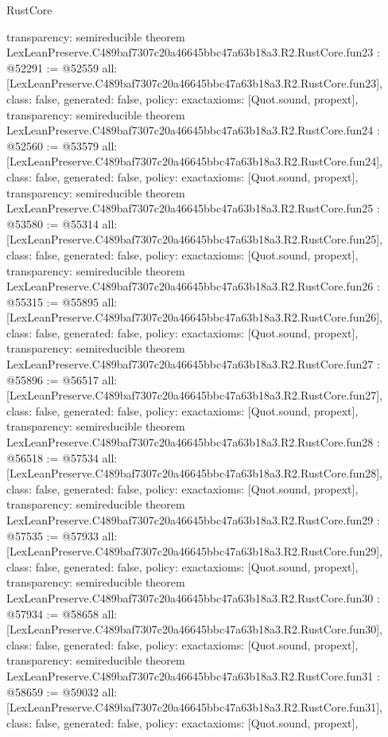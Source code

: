 \begin{lexlean}{RustCore}
\begin{coremodule}
{  transparency: semireducible
}
theorem LexLeanPreserve.C489baf7307c20a46645bbc47a63b18a3.R2.RustCore.fun23 : @52291 := @52559 {
  all: [LexLeanPreserve.C489baf7307c20a46645bbc47a63b18a3.R2.RustCore.fun23],
  class: false,
  generated: false,
  policy: exact{axioms: [Quot.sound, propext]},
  transparency: semireducible
}
theorem LexLeanPreserve.C489baf7307c20a46645bbc47a63b18a3.R2.RustCore.fun24 : @52560 := @53579 {
  all: [LexLeanPreserve.C489baf7307c20a46645bbc47a63b18a3.R2.RustCore.fun24],
  class: false,
  generated: false,
  policy: exact{axioms: [Quot.sound, propext]},
  transparency: semireducible
}
theorem LexLeanPreserve.C489baf7307c20a46645bbc47a63b18a3.R2.RustCore.fun25 : @53580 := @55314 {
  all: [LexLeanPreserve.C489baf7307c20a46645bbc47a63b18a3.R2.RustCore.fun25],
  class: false,
  generated: false,
  policy: exact{axioms: [Quot.sound, propext]},
  transparency: semireducible
}
theorem LexLeanPreserve.C489baf7307c20a46645bbc47a63b18a3.R2.RustCore.fun26 : @55315 := @55895 {
  all: [LexLeanPreserve.C489baf7307c20a46645bbc47a63b18a3.R2.RustCore.fun26],
  class: false,
  generated: false,
  policy: exact{axioms: [Quot.sound, propext]},
  transparency: semireducible
}
theorem LexLeanPreserve.C489baf7307c20a46645bbc47a63b18a3.R2.RustCore.fun27 : @55896 := @56517 {
  all: [LexLeanPreserve.C489baf7307c20a46645bbc47a63b18a3.R2.RustCore.fun27],
  class: false,
  generated: false,
  policy: exact{axioms: [Quot.sound, propext]},
  transparency: semireducible
}
theorem LexLeanPreserve.C489baf7307c20a46645bbc47a63b18a3.R2.RustCore.fun28 : @56518 := @57534 {
  all: [LexLeanPreserve.C489baf7307c20a46645bbc47a63b18a3.R2.RustCore.fun28],
  class: false,
  generated: false,
  policy: exact{axioms: [Quot.sound, propext]},
  transparency: semireducible
}
theorem LexLeanPreserve.C489baf7307c20a46645bbc47a63b18a3.R2.RustCore.fun29 : @57535 := @57933 {
  all: [LexLeanPreserve.C489baf7307c20a46645bbc47a63b18a3.R2.RustCore.fun29],
  class: false,
  generated: false,
  policy: exact{axioms: [Quot.sound, propext]},
  transparency: semireducible
}
theorem LexLeanPreserve.C489baf7307c20a46645bbc47a63b18a3.R2.RustCore.fun30 : @57934 := @58658 {
  all: [LexLeanPreserve.C489baf7307c20a46645bbc47a63b18a3.R2.RustCore.fun30],
  class: false,
  generated: false,
  policy: exact{axioms: [Quot.sound, propext]},
  transparency: semireducible
}
theorem LexLeanPreserve.C489baf7307c20a46645bbc47a63b18a3.R2.RustCore.fun31 : @58659 := @59032 {
  all: [LexLeanPreserve.C489baf7307c20a46645bbc47a63b18a3.R2.RustCore.fun31],
  class: false,
  generated: false,
  policy: exact{axioms: [Quot.sound, propext]},
}
\end{coremodule}
\end{lexlean}
